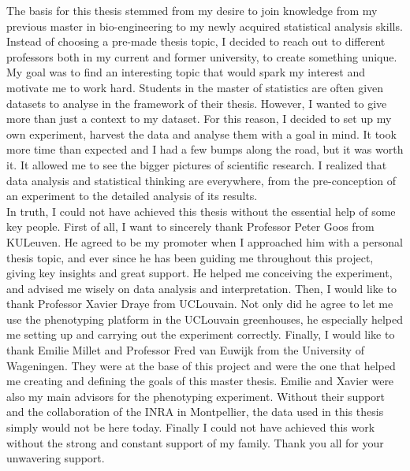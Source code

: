 The basis for this thesis stemmed from my desire to join knowledge from my previous master in bio-engineering to my newly acquired statistical analysis skills. Instead of choosing a pre-made thesis topic, I decided to reach out to different professors both in my current and former university, to create something unique. My goal was to find an interesting topic that would spark my interest and motivate me to work hard.
Students in the master of statistics are often given datasets to analyse in the framework of their thesis. However, I wanted to give more than just a context to my dataset. For this reason, I decided to set up my own experiment, harvest the data and analyse them with a goal in mind. It took more time than expected and I had a few bumps along the road, but it was worth it. It allowed me to see the bigger pictures of scientific research. I realized that data analysis and statistical thinking are everywhere, from the pre-conception of an experiment to the detailed analysis of its results.\\

In truth, I could not have achieved this thesis without the essential help of some key people. First of all, I want to sincerely thank Professor Peter Goos from KULeuven. He agreed to be my promoter when I approached him with a personal thesis topic, and ever since he has been guiding me throughout this project, giving key insights and great support. He helped me conceiving the experiment, and advised me wisely on data analysis and interpretation. Then, I would like to thank Professor Xavier Draye from UCLouvain. Not only did he agree to let me use the phenotyping platform in the UCLouvain greenhouses, he especially helped me setting up and carrying out the experiment correctly. Finally, I would like to thank Emilie Millet and Professor Fred van Euwijk from the University of Wageningen. They were at the base of this project and were the one that helped me creating and defining the goals of this master thesis. Emilie and Xavier were also my main advisors for the phenotyping experiment. Without their support and the collaboration of the INRA in Montpellier, the data used in this thesis simply would not be here today. Finally I could not have achieved this work without the strong and constant support of my family. Thank you all for your unwavering support. 